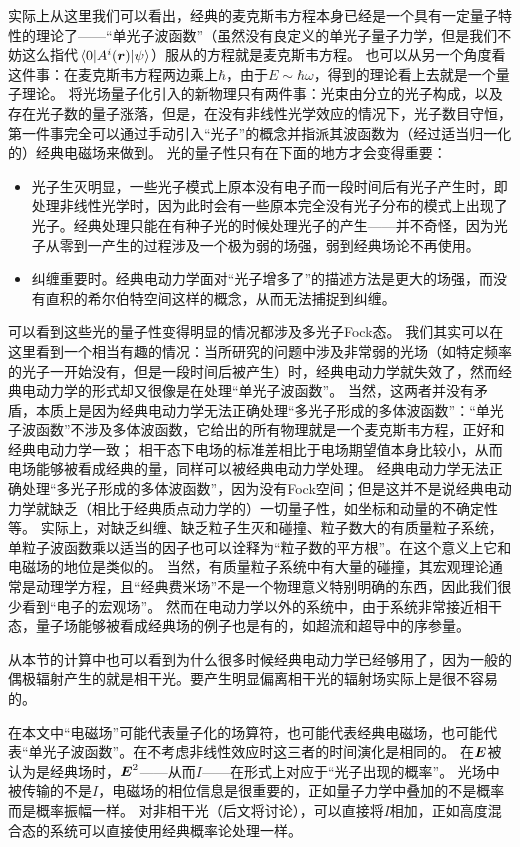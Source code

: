 实际上从这里我们可以看出，经典的麦克斯韦方程本身已经是一个具有一定量子特性的理论了——“单光子波函数”（虽然没有良定义的单光子量子力学，但是我们不妨这么指代$\mel*{0}{A^i(\vb*{r})}{\psi}$）服从的方程就是麦克斯韦方程。
也可以从另一个角度看这件事：在麦克斯韦方程两边乘上$\hbar$，由于$E \sim \hbar \omega$，得到的理论看上去就是一个量子理论。
将光场量子化引入的新物理只有两件事：光束由分立的光子构成，以及存在光子数的量子涨落，但是，在没有非线性光学效应的情况下，光子数目守恒，第一件事完全可以通过手动引入“光子”的概念并指派其波函数为（经过适当归一化的）经典电磁场来做到。
光的量子性只有在下面的地方才会变得重要：
\begin{itemize}
    \item 光子生灭明显，一些光子模式上原本没有电子而一段时间后有光子产生时，即处理非线性光学时，因为此时会有一些原本完全没有光子分布的模式上出现了光子。经典处理只能在有种子光的时候处理光子的产生——并不奇怪，因为光子从零到一产生的过程涉及一个极为弱的场强，弱到经典场论不再使用。
    \item 纠缠重要时。经典电动力学面对“光子增多了”的描述方法是更大的场强，而没有直积的希尔伯特空间这样的概念，从而无法捕捉到纠缠。
\end{itemize}
可以看到这些光的量子性变得明显的情况都涉及多光子Fock态。
我们其实可以在这里看到一个相当有趣的情况：当所研究的问题中涉及非常弱的光场（如特定频率的光子一开始没有，但是一段时间后被产生）时，经典电动力学就失效了，然而经典电动力学的形式却又很像是在处理“单光子波函数”。
当然，这两者并没有矛盾，本质上是因为经典电动力学无法正确处理“多光子形成的多体波函数”：“单光子波函数”不涉及多体波函数，它给出的所有物理就是一个麦克斯韦方程，正好和经典电动力学一致；
相干态下电场的标准差相比于电场期望值本身比较小，从而电场能够被看成经典的量，同样可以被经典电动力学处理。
经典电动力学无法正确处理“多光子形成的多体波函数”，因为没有Fock空间；但是这并不是说经典电动力学就缺乏（相比于经典质点动力学的）一切量子性，如坐标和动量的不确定性等。
实际上，对缺乏纠缠、缺乏粒子生灭和碰撞、粒子数大的有质量粒子系统，单粒子波函数乘以适当的因子也可以诠释为“粒子数的平方根”。在这个意义上它和电磁场的地位是类似的。
当然，有质量粒子系统中有大量的碰撞，其宏观理论通常是动理学方程，且“经典费米场”不是一个物理意义特别明确的东西，因此我们很少看到“电子的宏观场”。
然而在电动力学以外的系统中，由于系统非常接近相干态，量子场能够被看成经典场的例子也是有的，如超流和超导中的序参量。

从本节的计算中也可以看到为什么很多时候经典电动力学已经够用了，因为一般的偶极辐射产生的就是相干光。要产生明显偏离相干光的辐射场实际上是很不容易的。

在本文中“电磁场”可能代表量子化的场算符，也可能代表经典电磁场，也可能代表“单光子波函数”。在不考虑非线性效应时这三者的时间演化是相同的。
在$\vb*{E}$被认为是经典场时，$\vb*{E}^2$——从而$I$——在形式上对应于“光子出现的概率”。
光场中被传输的不是$I$，电磁场的相位信息是很重要的，正如量子力学中叠加的不是概率而是概率振幅一样。
对非相干光（后文将讨论），可以直接将$I$相加，正如高度混合态的系统可以直接使用经典概率论处理一样。

